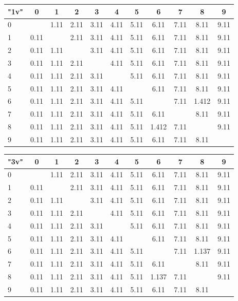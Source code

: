 \begin{table*}
	\begin{tabular}{|l||c|c|c|c|c|c|c|c|c|c|}\hline
		{\bf "1v"} & 0 & 1 & 2 & 3 & 4 & 5 & 6 & 7 & 8 & 9 \\\hline\hline
		0 &  & 1.11 & 2.11 & 3.11 & 4.11 & 5.11 & 6.11 & 7.11 & 8.11 & 9.11 \\\hline
		1 & 0.11 &  & 2.11 & 3.11 & 4.11 & 5.11 & 6.11 & 7.11 & 8.11 & 9.11 \\\hline
		2 & 0.11 & 1.11 & & 3.11 & 4.11 & 5.11 & 6.11 & 7.11 & 8.11 & 9.11 \\\hline
		3 & 0.11 & 1.11 & 2.11 & & 4.11 & 5.11 & 6.11 & 7.11 & 8.11 & 9.11 \\\hline
		4 & 0.11 & 1.11 & 2.11 & 3.11 & & 5.11 & 6.11 & 7.11 & 8.11 & 9.11 \\\hline
		5 & 0.11 & 1.11 & 2.11 & 3.11 & 4.11 & & 6.11 & 7.11 & 8.11 & 9.11 \\\hline
		6 & 0.11 & 1.11 & 2.11 & 3.11 & 4.11 & 5.11 & & 7.11 & 1.412 & 9.11 \\\hline
		7 & 0.11 & 1.11 & 2.11 & 3.11 & 4.11 & 5.11 & 6.11 & & 8.11 & 9.11 \\\hline
		8 & 0.11 & 1.11 & 2.11 & 3.11 & 4.11 & 5.11 & 1.412 & 7.11 &  & 9.11 \\\hline
		9 & 0.11 & 1.11 & 2.11 & 3.11 & 4.11 & 5.11 & 6.11 & 7.11 & 8.11 &  \\\hline
	\end{tabular}

	\vspace{0.3cm}
	
	\begin{tabular}{|l||c|c|c|c|c|c|c|c|c|c|}\hline
		{\bf "3v"} & 0 & 1 & 2 & 3 & 4 & 5 & 6 & 7 & 8 & 9 \\\hline\hline
		0 &  & 1.11 & 2.11 & 3.11 & 4.11 & 5.11 & 6.11 & 7.11 & 8.11 & 9.11 \\\hline
		1 & 0.11 &  & 2.11 & 3.11 & 4.11 & 5.11 & 6.11 & 7.11 & 8.11 & 9.11 \\\hline
		2 & 0.11 & 1.11 & & 3.11 & 4.11 & 5.11 & 6.11 & 7.11 & 8.11 & 9.11 \\\hline
		3 & 0.11 & 1.11 & 2.11 & & 4.11 & 5.11 & 6.11 & 7.11 & 8.11 & 9.11 \\\hline
		4 & 0.11 & 1.11 & 2.11 & 3.11 & & 5.11 & 6.11 & 7.11 & 8.11 & 9.11 \\\hline
		5 & 0.11 & 1.11 & 2.11 & 3.11 & 4.11 & & 6.11 & 7.11 & 8.11 & 9.11 \\\hline
		6 & 0.11 & 1.11 & 2.11 & 3.11 & 4.11 & 5.11 & & 7.11 & 1.137 & 9.11 \\\hline
		7 & 0.11 & 1.11 & 2.11 & 3.11 & 4.11 & 5.11 & 6.11 & & 8.11 & 9.11 \\\hline
		8 & 0.11 & 1.11 & 2.11 & 3.11 & 4.11 & 5.11 & 1.137 & 7.11 &  & 9.11 \\\hline
		9 & 0.11 & 1.11 & 2.11 & 3.11 & 4.11 & 5.11 & 6.11 & 7.11 & 8.11 &  \\\hline
	\end{tabular}
	

\end{table*}
